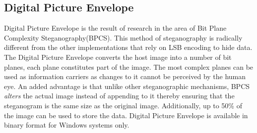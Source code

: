 \documentclass[12pt]{extreport}
\begin{document}
 \subsection{Digital Picture Envelope}
 Digital Picture Envelope is the result of research \cite{kawaguchi1998concept} in the area of Bit Plane Complexity Steganography(BPCS). This method of steganography is radically different from the other implementations that rely on LSB encoding to hide data. The Digital Picture Envelope converts the host image into a number of bit planes, each plane constitutes part of the image. The most complex planes can be used as information carriers as changes to it cannot be perceived by the human eye.  An added advantage is that unlike other steganographic mechanisms, BPCS \emph{alters} the actual image instead of appending to it thereby ensuring that the steganogram is the same size as the original image. Additionally, up to 50\% of the image can be used to store the data. Digital Picture Envelope is available in binary format for Windows systems only. 
 
\end{document}
